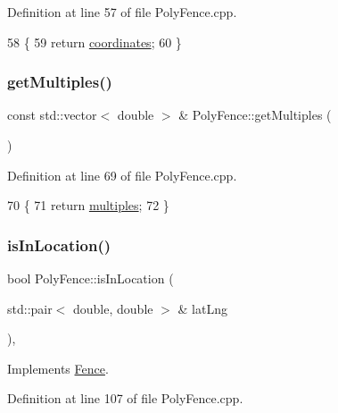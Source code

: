 Definition at line 57 of file Poly\+Fence.\+cpp.


\begin{DoxyCode}
58 \{
59     \textcolor{keywordflow}{return} \hyperlink{class_poly_fence_ae8e0c55e745979cab104ef80aeb4b418}{coordinates};
60 \}
\end{DoxyCode}
\mbox{\label{class_poly_fence_a2d67b5087a07fabcec9d3d240df6c417}} 
\subsubsection{\texorpdfstring{get\+Multiples()}{getMultiples()}}
{\footnotesize\ttfamily const std\+::vector$<$ double $>$ \& Poly\+Fence\+::get\+Multiples (\begin{DoxyParamCaption}{ }\end{DoxyParamCaption})}



Definition at line 69 of file Poly\+Fence.\+cpp.


\begin{DoxyCode}
70 \{
71     \textcolor{keywordflow}{return} \hyperlink{class_poly_fence_a2204e62b61b0e3c335734fa0b6cf0728}{multiples};
72 \}
\end{DoxyCode}
\mbox{\label{class_poly_fence_af8116af5be86f8426102985c3dbcdf5e}} 
\subsubsection{\texorpdfstring{is\+In\+Location()}{isInLocation()}}
{\footnotesize\ttfamily bool Poly\+Fence\+::is\+In\+Location (\begin{DoxyParamCaption}\item[{std\+::pair$<$ double, double $>$ \&}]{lat\+Lng }\end{DoxyParamCaption})\hspace{0.3cm}{\ttfamily [override]}, {\ttfamily [virtual]}}



Implements \hyperlink{class_fence_a80fb7fbb60592d3e8afc0ecb5122b987}{Fence}.



Definition at line 107 of file Poly\+Fence.\+cpp.


